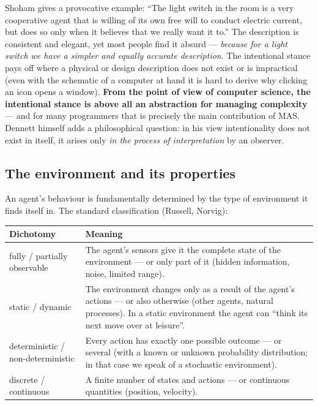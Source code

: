\documentclass[11pt,a4paper]{article}
\theoremstyle{definition}
\providecommand{\uv}[1]{``#1''}
\begin{document}
Shoham gives a provocative example: \uv{The light switch in the room is a very cooperative agent
that is willing of its own free will to conduct electric current, but does so only when it
believes that we really want it to.} The description is consistent and elegant, yet most people
find it absurd --- \emph{because for a light switch we have a simpler and equally accurate
description}. The intentional stance pays off where a physical or design description does not
exist or is impractical (even with the schematic of a computer at hand it is hard to derive why
clicking an icon opens a window).
\textbf{From the point of view of computer science, the intentional stance is above all an
abstraction for managing complexity} --- and for many programmers that is precisely the main
contribution of MAS. Dennett himself adds a philosophical question: in his view intentionality
does not exist in itself, it arises only \emph{in the process of interpretation} by an observer.

\subsection{The environment and its properties}

An agent's behaviour is fundamentally determined by the type of environment it finds itself in.
The standard classification (Russell, Norvig):

\begin{center}
\begin{tabular}{p{} p{}}
\toprule
\textbf{Dichotomy} & \textbf{Meaning} \\
\midrule
fully / partially observable
  & The agent's sensors give it the complete state of the environment --- or only part of it
    (hidden information, noise, limited range). \\
static / dynamic
  & The environment changes only as a result of the agent's actions --- or also otherwise (other
    agents, natural processes). In a static environment the agent can \uv{think its next move over
    at leisure}. \\
deterministic / non-deterministic
  & Every action has exactly one possible outcome --- or several (with a known or unknown
    probability distribution; in that case we speak of a stochastic environment). \\
discrete / continuous
  & A finite number of states and actions --- or continuous quantities (position, velocity). \\
\bottomrule
\end{tabular}
\end{center}
\end{document}
